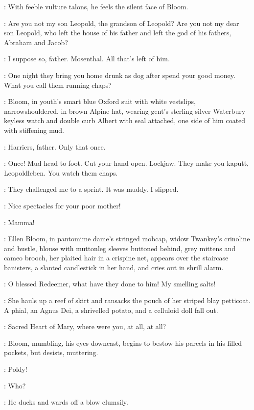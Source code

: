 :
With feeble vulture talons, he feels the silent face of Bloom.

\Rudolph:
Are you not my son Leopold, the grandson of Leopold?
Are you not my dear son Leopold, who left the house of his father
and left the god of his fathers, Abraham and Jacob?

\Bloom:
I suppose so, father.
Mosenthal.
All that's left of him.

\Rudolph:
One night they bring you home drunk as dog after spend your good money.
What you call them running chaps?

:
Bloom, in youth's smart blue Oxford suit with white vestslips,
narrowshouldered, in brown Alpine hat,
wearing gent's sterling silver Waterbury keyless watch
and double curb Albert with seal attached,
one side of him coated with stiffening mud.

\Bloom:
Harriers, father.
Only that once.

\Rudolph:
Once! Mud head to foot.
Cut your hand open. Lockjaw.
They make you kaputt, Leopoldleben.
You watch them chaps.

\Bloom:
They challenged me to a sprint.
It was muddy.
I slipped.

\Rudolph:
Nice spectacles for your poor mother!

\Bloom:
Mamma!

:
Ellen Bloom, in pantomime dame's stringed mobcap,
widow Twankey's crinoline and bustle,
blouse with muttonleg sleeves buttoned behind,
grey mittens and cameo brooch,
her plaited hair in a crispine net,
appears over the staircase banisters,
a slanted candlestick in her hand,
and cries out in shrill alarm.

\Ellen:
O blessed Redeemer, what have they done to him!
My smelling salts!

:
She hauls up a reef of skirt and ransacks the
pouch of her striped blay petticoat.
A phial, an Agnus Dei,
a shrivelled potato, and a celluloid doll fall out.

\Ellen:
Sacred Heart of Mary, where were you, at all, at all?

:
Bloom, mumbling, his eyes downcast,
begins to bestow his parcels in his filled pockets, but desists, muttering.

\Marion:
 Poldy!

\Bloom:
Who?

:
He ducks and wards off a blow clumsily.

